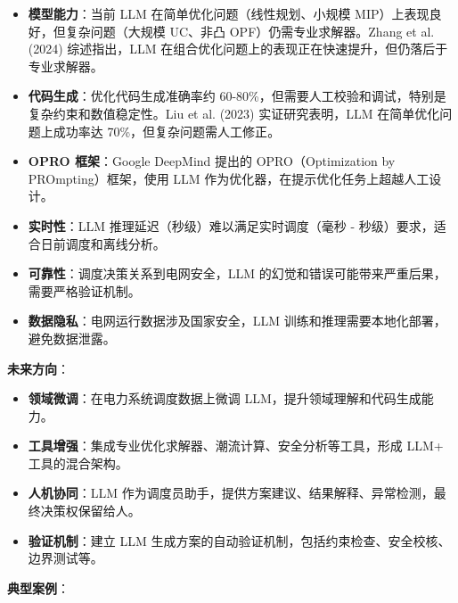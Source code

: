 \documentclass[12pt,a4paper]{article}
\begin{document}
\begin{itemize}
    \item \textbf{模型能力}：当前 LLM 在简单优化问题（线性规划、小规模 MIP）上表现良好，但复杂问题（大规模 UC、非凸 OPF）仍需专业求解器。Zhang et al. (2024) 综述指出，LLM 在组合优化问题上的表现正在快速提升，但仍落后于专业求解器\cite{zhang2024llm}。
    
    \item \textbf{代码生成}：优化代码生成准确率约 60-80\%，但需要人工校验和调试，特别是复杂约束和数值稳定性。Liu et al. (2023) 实证研究表明，LLM 在简单优化问题上成功率达 70\%，但复杂问题需人工修正\cite{liu2023can}。
    
    \item \textbf{OPRO 框架}：Google DeepMind 提出的 OPRO（Optimization by PROmpting）框架，使用 LLM 作为优化器，在提示优化任务上超越人工设计\cite{yang2023opro}。
    
    \item \textbf{实时性}：LLM 推理延迟（秒级）难以满足实时调度（毫秒 - 秒级）要求，适合日前调度和离线分析。
    
    \item \textbf{可靠性}：调度决策关系到电网安全，LLM 的幻觉和错误可能带来严重后果，需要严格验证机制。
    
    \item \textbf{数据隐私}：电网运行数据涉及国家安全，LLM 训练和推理需要本地化部署，避免数据泄露。
\end{itemize}

\textbf{未来方向}：

\begin{itemize}
    \item \textbf{领域微调}：在电力系统调度数据上微调 LLM，提升领域理解和代码生成能力。
    
    \item \textbf{工具增强}：集成专业优化求解器、潮流计算、安全分析等工具，形成 LLM+ 工具的混合架构。
    
    \item \textbf{人机协同}：LLM 作为调度员助手，提供方案建议、结果解释、异常检测，最终决策权保留给人。
    
    \item \textbf{验证机制}：建立 LLM 生成方案的自动验证机制，包括约束检查、安全校核、边界测试等。
\end{itemize}

\textbf{典型案例}：
\end{document}
